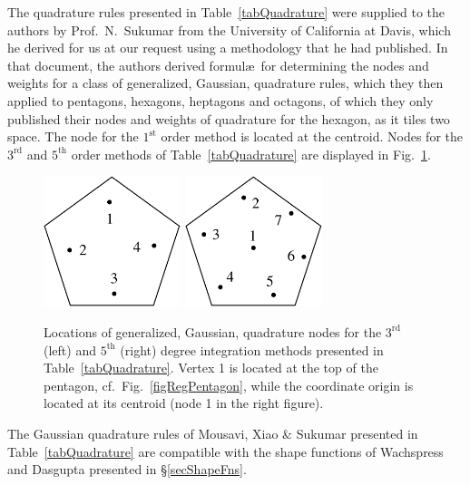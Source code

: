 The quadrature rules presented in Table~\ref{tabQuadrature} were supplied to the authors by Prof.\ N.\ Sukumar from the University of California at Davis, which he derived for us at our request using a methodology that he had published. \cite{Mousavietal10}  In that document, the authors derived formul\ae\ for determining the nodes and weights for a class of generalized, Gaussian, quadrature rules, which they then applied to pentagons, hexagons, heptagons and octagons, of which they only published their nodes and weights of quadrature for the hexagon, as it tiles two space.  The node for the $1^{\mathrm{st}}$ order method is located at the centroid.  Nodes for the $3^{\mathrm{rd}}$ and $5^{\mathrm{th}}$ order methods of Table~\ref{tabQuadrature} are displayed in Fig.~\ref{figQuadrature}.

\begin{figure}
    \centering
    \includegraphics[width=4cm]{figures/pentagon_degree3.pdf}
    \hspace{1cm}
    \includegraphics[width=4cm]{figures/pentagon_degree5.pdf}
    \caption{Locations of generalized, Gaussian, quadrature nodes for the $3^{\mathrm{rd}}$ (left) and $5^{\mathrm{th}}$ (right) degree integration methods presented in Table~\ref{tabQuadrature}.  Vertex 1 is located at the top of the pentagon, cf.\ Fig.~\ref{figRegPentagon}, while the coordinate origin is located at its centroid (node 1 in the right figure).}
    \label{figQuadrature}
\end{figure}

The Gaussian quadrature rules of Mousavi, Xiao \& Sukumar \cite{Mousavietal10} presented in Table~\ref{tabQuadrature} are compatible with the shape functions of Wachspress \cite{Wachspress75,Wachspress16} and Dasgupta \cite{Dasgupta03} presented in \S\ref{secShapeFns}.

